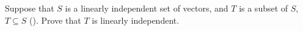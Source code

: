 Suppose that $S$ is a linearly independent set of vectors, and $T$ is a subset of $S$, $T\subseteq S$ ().  Prove that $T$ is linearly independent.